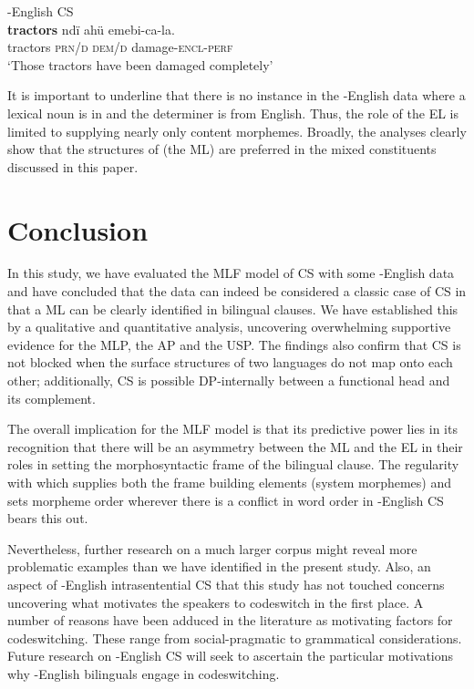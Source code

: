 \documentclass[output=paper]{langsci/langscibook}
\begin{document}
\ea\label{ex:ihemere:23}
{-English CS}\\
\gll \textbf{tractors}  ndï    ahü  emebi-ca-la.\\
     tractors  \textsc{prn/d}    \textsc{dem/d}  damage-\textsc{encl-perf} \\
\glt ‘Those tractors have been damaged completely’
\z

It is important to underline that there is no instance in the -English data where a lexical noun is in  and the determiner is from English. Thus, the role of the EL is limited to supplying nearly only content morphemes. Broadly, the analyses clearly show that the structures of  (the ML) are preferred in the mixed constituents discussed in this paper.

\section{Conclusion}\label{sec:ihemere:8}

In this study, we have evaluated the MLF model of CS with some -English data and have concluded that the data can indeed be considered a classic case of CS in that a ML can be clearly identified in bilingual clauses. We have established this by a qualitative and quantitative analysis, uncovering overwhelming supportive evidence for the MLP, the AP and the USP. The findings also confirm that CS is not blocked when the surface structures of two languages do not map onto each other; additionally, CS is possible DP-internally between a functional head and its complement. 

The overall implication for the MLF model is that its predictive power lies in its recognition that there will be an asymmetry between the ML and the EL in their roles in setting the morphosyntactic frame of the bilingual clause. The regularity with which  supplies both the frame building elements (system morphemes) and sets morpheme order wherever there is a conflict in word order in -English CS bears this out. 

Nevertheless, further research on a much larger corpus might reveal more problematic examples than we have identified in the present study. Also, an aspect of -English intrasentential CS that this study has not touched  concerns uncovering what motivates the speakers to codeswitch in the first place. A number of reasons have been adduced in the literature as motivating factors for codeswitching. These range from social-pragmatic to grammatical considerations. Future research on -English CS will seek to ascertain the particular motivations why -English bilinguals engage in codeswitching.
\end{document}
